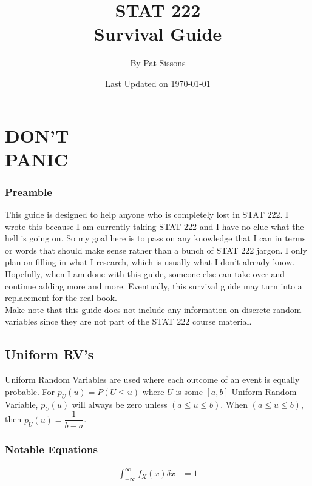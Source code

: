 \documentclass[10pt]{report}
\title{STAT 222\\Survival Guide}
\author{By Pat Sissons}
\date{Last Updated on \today}
\begin{document}
\begin{titlepage}
\maketitle
\end{titlepage} 

\part*{DON'T\\PANIC}

\pagebreak

\tableofcontents

\pagebreak

\section*{Preamble}
This guide is designed to help anyone who is completely lost in STAT 222.  I wrote this because I am currently taking STAT 222 and I have no clue what the hell is going on.  So my goal here is to pass on any knowledge that I can in terms or words that should make sense rather than a bunch of STAT 222 jargon.  I only plan on filling in what I research, which is usually what I don't already know.  Hopefully, when I am done with this guide, someone else can take over and continue adding more and more.  Eventually, this survival guide may turn into a replacement for the real book.\\
Make note that this guide does not include any information on discrete random variables since they are not part of the STAT 222 course material.\\

\chapter{Uniform RV's}
Uniform Random Variables are used where each outcome of an event is equally probable.  For $p_{U}(u) = P(U \leq u)$ where $U$ is some $[a, b]$-Uniform Random Variable, $p_{U}(u)$ will always be zero unless $(a \leq u \leq b)$.  When $(a \leq u \leq b)$, then $p_{U}(u) = \dfrac{1}{b-a}$.\\
\section*{Notable Equations}
\begin{align*}
\int_{-\infty}^{\infty}f_{X}(x)\delta x& = 1\\
\end{align*}
\end{document}
